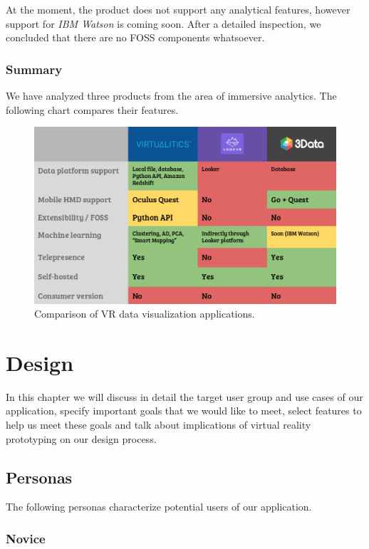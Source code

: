 \documentclass[thesis=M,english,hidelinks]{FITthesisXE}[2012/06/26]
\begin{document}
At the moment, the product does not support any analytical features, however support for \emph{IBM Watson} is coming soon. After a detailed inspection, we concluded that there are no FOSS components whatsoever.

\subsection{Summary}

We have analyzed three products from the area of immersive analytics. The following chart compares their features.

\begin{figure}[!h]
\centering
\includegraphics[scale=0.35]{comparison}
\caption{Comparison of VR data visualization applications.}
\label{fig:comparison}
\end{figure}

\chapter{Design}

In this chapter we will discuss in detail the target user group and use cases of our application, specify important goals that we would like to meet, select features to help us meet these goals and talk about implications of virtual reality prototyping on our design process.

\section{Personas}

The following personas characterize potential users of our application.

\subsection{Novice}
\end{document}
